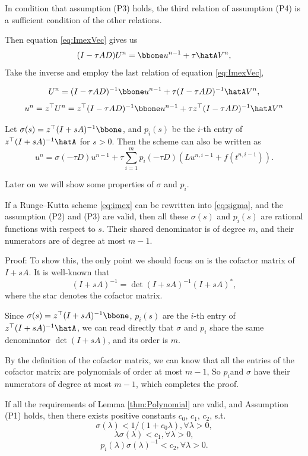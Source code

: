 \begin{remark}
    In condition that assumption (P3) holds, the third relation of 
    assumption (P4) is a sufficient condition of the other relations. 
\end{remark}
Then equation \eqref{eq:ImexVec} gives us
$$(I - \tau AD)U^n = \bbone u^{n-1} + \tau \hatA V^n,$$
Take the inverse and employ the last relation of equation \ref{eq:ImexVec},

$$U^n = (I - \tau AD)^{-1}\bbone u^{n-1} + \tau (I - \tau AD)^{-1}\hatA V^n,$$
$$u^n = z^\top U^n = z^\top(I - \tau AD)^{-1}\bbone u^{n-1} + \tau z^\top(I - \tau AD)^{-1}\hatA V^n$$


Let $\sigma(s) = z^\top(I + sA)^{-1}\bbone$,
and $p_i(s)$ be the $i$-th entry of $z^\top(I + sA)^{-1}\hatA$
for $s > 0$.
Then the scheme can also be written as
\begin{equation}\label{eq:sigma}
    u^n = \sigma(-\tau D) u^{n-1} + \tau \sum_{i=1}^m p_i(-\tau D)(L u^{n,i-1} + f(t^{n, i-1})).
\end{equation}

Later on we will show some properties of $\sigma$ and $p_i$.


\begin{lemma}\label{thm:Polynomial}
    If a Runge--Kutta scheme \ref{eq:imex} can be rewritten into \ref{eq:sigma},
    and the assumption (P2) and (P3) are valid,
    then all these $\sigma(s)$ and $p_i(s)$ are rational functions with respect to $s$.
    Their shared denominator is of degree $m$,
    and their numerators are of degree at most $m-1$.
\end{lemma}

Proof:
To show this, the only point we should focus on is the cofactor matrix
of $I+sA$. It is well-known that
$$(I+sA)^{-1} = \det(I+sA)^{-1} (I+sA)^*,$$
where the star denotes the cofactor matrix.

Since $\sigma(s) = z^\top(I + sA)^{-1}\bbone$,
$p_i(s)$ are the $i$-th entry of $z^\top(I + sA)^{-1}\hatA$,
we can read directly that $\sigma$ and $p_i$
share the same denominator $\det(I+sA)$, and
its order is $m$.

By the definition of the cofactor matrix,
we can know that all the entries of the cofactor matrix are polynomials of order at most $m-1$,
So $p_i$and $\sigma$ have their numerators of degree at most $m-1$,
which completes the proof.

\begin{corollary}\label{thm:PiSigmaBound}
    If all the requirements of Lemma \ref{thm:Polynomial} are valid,
    and Assumption (P1) holds,
    then there exists positive constants $c_0$, $c_1$, $c_2$, s.t.
    $$ \sigma(\lambda) < 1/(1+c_0\lambda), \forall \lambda > 0, $$
    $$ \lambda \sigma(\lambda) < c_1, \forall \lambda > 0, $$
    $$ p_i(\lambda)\sigma(\lambda)^{-1} < c_2, \forall \lambda > 0. $$
\end{corollary}

